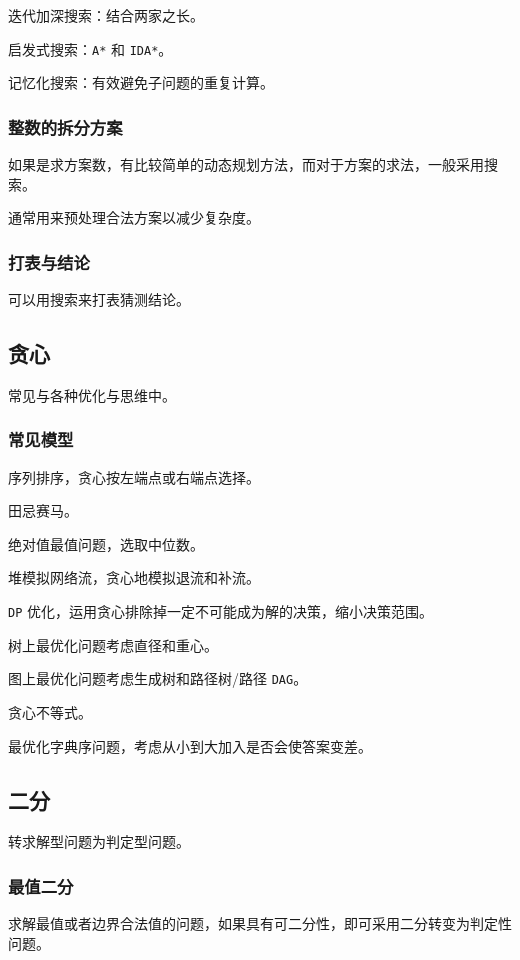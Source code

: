 \documentclass[UTF-8]{ctexart}
\begin{document}
	迭代加深搜索：结合两家之长。
	
	启发式搜索：\texttt{A*} 和 \texttt{IDA*}。
	
	记忆化搜索：有效避免子问题的重复计算。
	
	\subsubsection{整数的拆分方案}
	如果是求方案数，有比较简单的动态规划方法，而对于方案的求法，一般采用搜索。
	
	通常用来预处理合法方案以减少复杂度。
	
	\subsubsection{打表与结论}
	可以用搜索来打表猜测结论。
	
	\subsection{贪心}
	常见与各种优化与思维中。
	
	\subsubsection{常见模型}
	序列排序，贪心按左端点或右端点选择。
	
	田忌赛马。
	
	绝对值最值问题，选取中位数。
	
	堆模拟网络流，贪心地模拟退流和补流。
	
	\texttt{DP} 优化，运用贪心排除掉一定不可能成为解的决策，缩小决策范围。
	
	树上最优化问题考虑直径和重心。
	
	图上最优化问题考虑生成树和路径树/路径 \texttt{DAG}。
	
	贪心不等式。
	
	最优化字典序问题，考虑从小到大加入是否会使答案变差。
	
	\subsection{二分}
	转求解型问题为判定型问题。
	
	\subsubsection{最值二分}
	求解最值或者边界合法值的问题，如果具有可二分性，即可采用二分转变为判定性问题。
	
\end{document}
